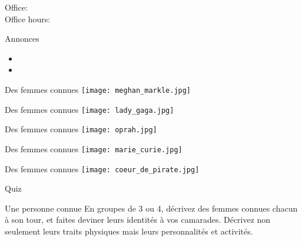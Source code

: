 \documentclass{beamer}
\subtitle[Femmes et questions]{Les femmes et les questions}
\begin{document}
  \begin{frame}
    \titlepage
    \tiny{Office: \\
          Office hours: }
  \end{frame}

  \begin{frame}{Annonces}
    \begin{itemize}
      \item
      \item[] \gloss{}
    \end{itemize}
  \end{frame}

  \begin{frame}{Des femmes connues}
    \texttt{[image: meghan\_markle.jpg]}
  \end{frame}

  \begin{frame}{Des femmes connues}
    \texttt{[image: lady\_gaga.jpg]}
  \end{frame}

  \begin{frame}{Des femmes connues}
    \texttt{[image: oprah.jpg]}
  \end{frame}

  \begin{frame}{Des femmes connues}
    \texttt{[image: marie\_curie.jpg]}
  \end{frame}

  \begin{frame}{Des femmes connues}
    \texttt{[image: coeur\_de\_pirate.jpg]}
  \end{frame}

  \begin{frame}{}
    \begin{center}
      \Large Quiz
    \end{center}
  \end{frame}

  \begin{frame}{Une personne connue}
    En groupes de 3 ou 4, décrivez des femmes connues chacun à son tour, et faites deviner leurs identités à vos camarades. Décrivez non seulement leurs traits physiques mais leurs personnalités et activités. \\
  \end{frame}
\end{document}
